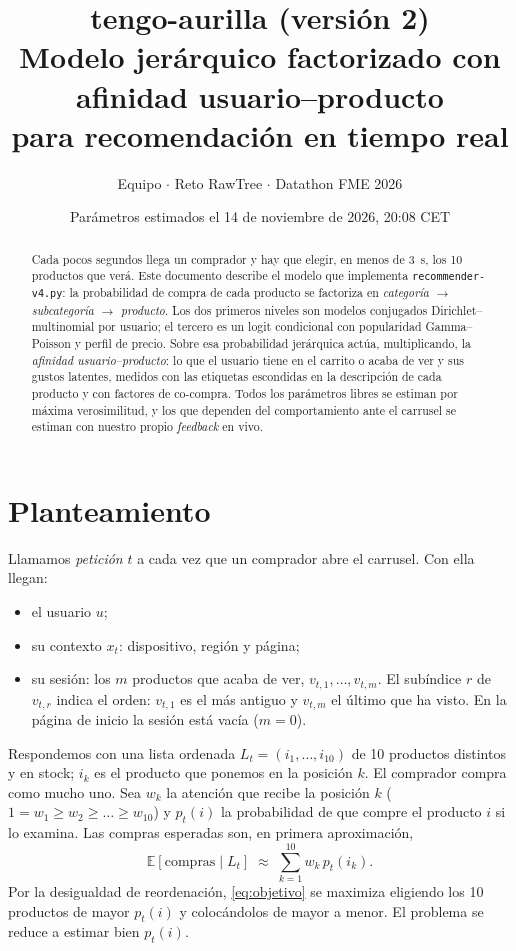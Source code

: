 \documentclass[11pt,a4paper]{article}
\title{\textbf{tengo-aurilla} (versión 2)\\[0.3em]
\large Modelo jerárquico factorizado con afinidad usuario--producto\\ para recomendación en tiempo real}
\author{Equipo \cod{team\_03} $\cdot$ Reto RawTree $\cdot$ Datathon FME 2026}
\date{Parámetros estimados el 14 de noviembre de 2026, 20:08 CET}
\newcommand{\E}{\mathbb{E}}
\newcommand{\cod}[1]{\texttt{#1}}
\begin{document}
\maketitle

\begin{abstract}
\noindent Cada pocos segundos llega un comprador y hay que elegir, en menos de 3~s, los 10 productos
que verá. Este documento describe el modelo que implementa \cod{recommender-v4.py}: la probabilidad
de compra de cada producto se factoriza en \emph{categoría $\to$ subcategoría $\to$ producto}. Los dos
primeros niveles son modelos conjugados Dirichlet--multinomial por usuario; el tercero es un logit
condicional con popularidad Gamma--Poisson y perfil de precio. Sobre esa probabilidad jerárquica actúa,
multiplicando, la \emph{afinidad usuario--producto}: lo que el usuario tiene en el carrito o acaba de ver
y sus gustos latentes, medidos con las etiquetas escondidas en la descripción de cada producto y con
factores de co-compra. Todos los parámetros libres se estiman por máxima verosimilitud, y los que
dependen del comportamiento ante el carrusel se estiman con nuestro propio \emph{feedback} en vivo.
\end{abstract}

\section{Planteamiento}

Llamamos \emph{petición} $t$ a cada vez que un comprador abre el carrusel. Con ella llegan:
\begin{itemize}\setlength{\itemsep}{0.1em}
\item el usuario $u$;
\item su contexto $x_t$: dispositivo, región y página;
\item su sesión: los $m$ productos que acaba de ver, $v_{t,1},\dots,v_{t,m}$. El subíndice $r$ de
$v_{t,r}$ indica el orden: $v_{t,1}$ es el más antiguo y $v_{t,m}$ el último que ha visto. En la página
de inicio la sesión está vacía ($m=0$).
\end{itemize}
Respondemos con una lista ordenada $L_t=(i_1,\dots,i_{10})$ de 10 productos distintos y en stock; $i_k$
es el producto que ponemos en la posición $k$. El comprador compra como mucho uno. Sea $w_k$ la atención
que recibe la posición $k$ ($1=w_1\ge w_2\ge\dots\ge w_{10}$) y $p_t(i)$ la probabilidad de que compre
el producto $i$ si lo examina. Las compras esperadas son, en primera aproximación,
\begin{equation}
\E[\text{compras}\mid L_t] \;\approx\; \sum_{k=1}^{10} w_k\, p_t(i_k). \label{eq:objetivo}
\end{equation}
Por la desigualdad de reordenación, \eqref{eq:objetivo} se maximiza eligiendo los 10 productos de
mayor $p_t(i)$ y colocándolos de mayor a menor. El problema se reduce a estimar bien $p_t(i)$.
\end{document}
